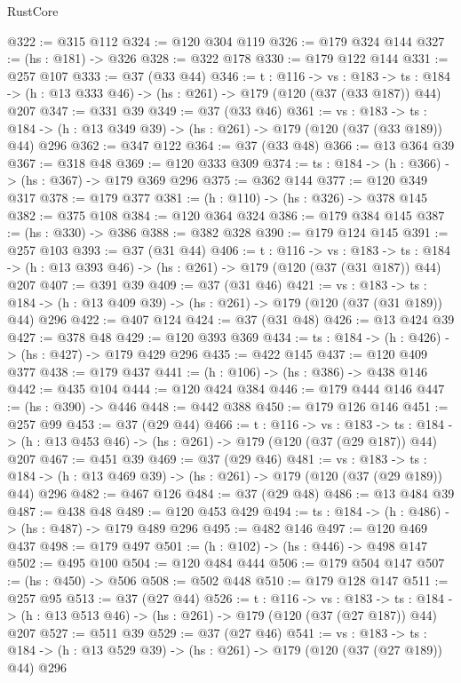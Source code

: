 \begin{lexlean}{RustCore}
\begin{coremodule}
@322 := @315 @112
@324 := @120 @304 @119
@326 := @179 @324 @144
@327 := (hs : @181) -> @326
@328 := @322 @178
@330 := @179 @122 @144
@331 := @257 @107
@333 := @37 (@33 @44)
@346 := {t : @116} ->
  {vs : @183} ->
  {ts : @184} -> (h : @13 @333 @46) -> (hs : @261) -> @179 (@120 (@37 (@33 @187)) @44) @207
@347 := @331 @39
@349 := @37 (@33 @46)
@361 := {vs : @183} ->
  {ts : @184} -> (h : @13 @349 @39) -> (hs : @261) -> @179 (@120 (@37 (@33 @189)) @44) @296
@362 := @347 @122
@364 := @37 (@33 @48)
@366 := @13 @364 @39
@367 := @318 @48
@369 := @120 @333 @309
@374 := {ts : @184} -> (h : @366) -> (hs : @367) -> @179 @369 @296
@375 := @362 @144
@377 := @120 @349 @317
@378 := @179 @377
@381 := (h : @110) -> (hs : @326) -> @378 @145
@382 := @375 @108
@384 := @120 @364 @324
@386 := @179 @384 @145
@387 := (hs : @330) -> @386
@388 := @382 @328
@390 := @179 @124 @145
@391 := @257 @103
@393 := @37 (@31 @44)
@406 := {t : @116} ->
  {vs : @183} ->
  {ts : @184} -> (h : @13 @393 @46) -> (hs : @261) -> @179 (@120 (@37 (@31 @187)) @44) @207
@407 := @391 @39
@409 := @37 (@31 @46)
@421 := {vs : @183} ->
  {ts : @184} -> (h : @13 @409 @39) -> (hs : @261) -> @179 (@120 (@37 (@31 @189)) @44) @296
@422 := @407 @124
@424 := @37 (@31 @48)
@426 := @13 @424 @39
@427 := @378 @48
@429 := @120 @393 @369
@434 := {ts : @184} -> (h : @426) -> (hs : @427) -> @179 @429 @296
@435 := @422 @145
@437 := @120 @409 @377
@438 := @179 @437
@441 := (h : @106) -> (hs : @386) -> @438 @146
@442 := @435 @104
@444 := @120 @424 @384
@446 := @179 @444 @146
@447 := (hs : @390) -> @446
@448 := @442 @388
@450 := @179 @126 @146
@451 := @257 @99
@453 := @37 (@29 @44)
@466 := {t : @116} ->
  {vs : @183} ->
  {ts : @184} -> (h : @13 @453 @46) -> (hs : @261) -> @179 (@120 (@37 (@29 @187)) @44) @207
@467 := @451 @39
@469 := @37 (@29 @46)
@481 := {vs : @183} ->
  {ts : @184} -> (h : @13 @469 @39) -> (hs : @261) -> @179 (@120 (@37 (@29 @189)) @44) @296
@482 := @467 @126
@484 := @37 (@29 @48)
@486 := @13 @484 @39
@487 := @438 @48
@489 := @120 @453 @429
@494 := {ts : @184} -> (h : @486) -> (hs : @487) -> @179 @489 @296
@495 := @482 @146
@497 := @120 @469 @437
@498 := @179 @497
@501 := (h : @102) -> (hs : @446) -> @498 @147
@502 := @495 @100
@504 := @120 @484 @444
@506 := @179 @504 @147
@507 := (hs : @450) -> @506
@508 := @502 @448
@510 := @179 @128 @147
@511 := @257 @95
@513 := @37 (@27 @44)
@526 := {t : @116} ->
  {vs : @183} ->
  {ts : @184} -> (h : @13 @513 @46) -> (hs : @261) -> @179 (@120 (@37 (@27 @187)) @44) @207
@527 := @511 @39
@529 := @37 (@27 @46)
@541 := {vs : @183} ->
  {ts : @184} -> (h : @13 @529 @39) -> (hs : @261) -> @179 (@120 (@37 (@27 @189)) @44) @296

\end{coremodule}
\end{lexlean}
